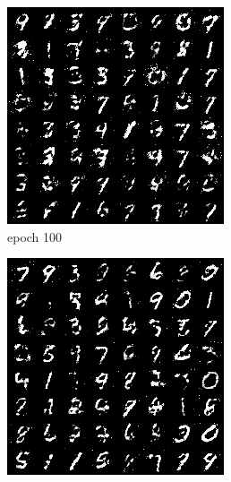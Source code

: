 \documentclass[a4paper]{article}
\theoremstyle{definition}
\newenvironment{soln}{
	\leavevmode\color{blue}\ignorespaces
}{}
\begin{document}
\begin{enumerate} [label=(\alph*)]
\begin{soln}
			\begin{figure}[H]
				\centering
				\begin{subfigure}[b]{0.3\textwidth}
					\centering
					\includegraphics[width=\textwidth]{1c_e100.png}
					\caption{epoch 100}
				\end{subfigure}
				\hfill
				\begin{subfigure}[b]{0.3\textwidth}
					\centering
					\includegraphics[width=\textwidth]{1c_e150.png}

\end{subfigure}
\end{figure}
\end{soln}
\end{enumerate}
\end{document}
